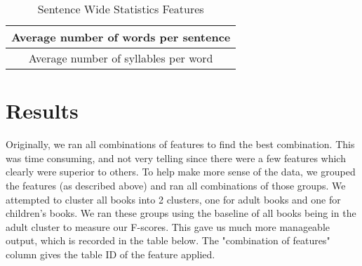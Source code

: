 \documentclass[]{article}
\begin{document}
\begin{table}[!htbp]
	\begin{center}
		\begin{tabular}{| c |} \hline
			Average number of words per sentence \\ \hline
      Average number of syllables per word \\ \hline
		\end{tabular}
	\end{center}
	\caption{Sentence Wide Statistics Features}
	\label{table:group6}
\end{table}


\section{Results}

Originally, we ran all combinations of features to find the best combination.
This was time consuming, and not very telling since there were a few features which clearly were superior to others.
To help make more sense of the data, we grouped the features (as described above) and ran all combinations of those groups.
We attempted to cluster all books into 2 clusters, one for adult books and one for children's books.
We ran these groups using the baseline of all books being in the adult cluster to measure our F-scores.
This gave us much more manageable output, which is recorded in the table below.
The "combination of features" column gives the table ID of the feature applied.
\end{document}
